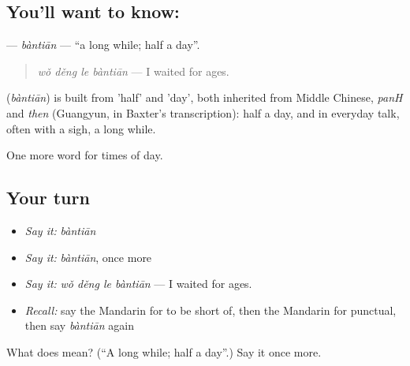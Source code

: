 \subsection*{You'll want to know: }
\textbf{} — \emph{bàntiān} — \textquotedblleft{}a long while; half a day\textquotedblright{}.

\begin{quote}
\emph{wǒ děng le bàntiān} — I waited for ages.
\end{quote}

\begin{cousinweb}
\textbf{} (\emph{bàntiān}) is built from  'half' and  'day', both inherited from Middle Chinese, \emph{panH} and \emph{then} (Guangyun, in Baxter's transcription): half a day, and in everyday talk, often with a sigh, a long while.
\end{cousinweb}

\begin{grammarlens}[title={What you've built}]
One more word for times of day.
\end{grammarlens}

\subsection*{Your turn}
\begin{itemize}
\raggedright
  \item \emph{Say it:} \emph{bàntiān}
  \item \emph{Say it:} \emph{bàntiān}, once more
  \item \emph{Say it:} \emph{wǒ děng le bàntiān} — I waited for ages.
  \item \emph{Recall:} say the Mandarin for to be short of, then the Mandarin for punctual, then say \emph{bàntiān} again
\end{itemize}

\begin{tcolorbox}[breakable,colback=teal!4,colframe=teal!35!black,title={Before you move on}]
What does  mean? (\textquotedblleft{}A long while; half a day\textquotedblright{}.) Say it once more.
\end{tcolorbox}
